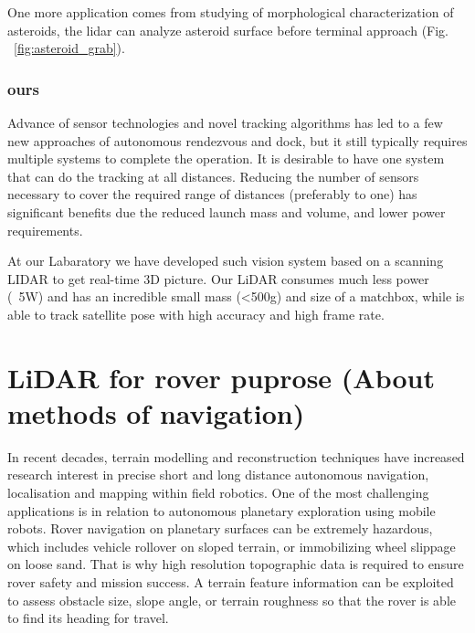 One more application comes from studying of morphological characterization of asteroids, the lidar can analyze asteroid surface before terminal approach (Fig. ~\ref{fig:asteroid_grab}).







\subsubsection{ours}
Advance of sensor technologies and novel tracking algorithms has led to a few new approaches of autonomous rendezvous and dock,
but it still typically requires multiple systems to complete the operation. It is desirable to have one system that can do the tracking at all distances. 
Reducing the number of sensors necessary to cover the required range of distances (preferably to one) has significant
benefits due the reduced launch mass and volume, and lower power requirements.

At our Labaratory we have developed such vision system based on a scanning LIDAR to get real-time 3D picture.
Our LiDAR consumes much less power (~5W) and has an incredible small mass (<500g) and size of a matchbox, while is able to track satellite pose with high accuracy and high frame rate.




















\section{LiDAR for rover puprose (About methods of navigation)}

In recent decades, terrain modelling and reconstruction techniques have increased research
interest in precise short and long distance autonomous navigation, localisation and mapping within field robotics. One of the most challenging applications is in relation to autonomous planetary exploration using mobile robots.
Rover navigation on planetary surfaces can be extremely hazardous, which includes vehicle rollover on sloped terrain, or immobilizing wheel slippage on loose sand. That is why high
resolution topographic data is required to ensure rover safety and mission success. 
A terrain feature information can be exploited to assess
obstacle size, slope angle, or terrain roughness so that
the rover is able to find its heading for travel.

